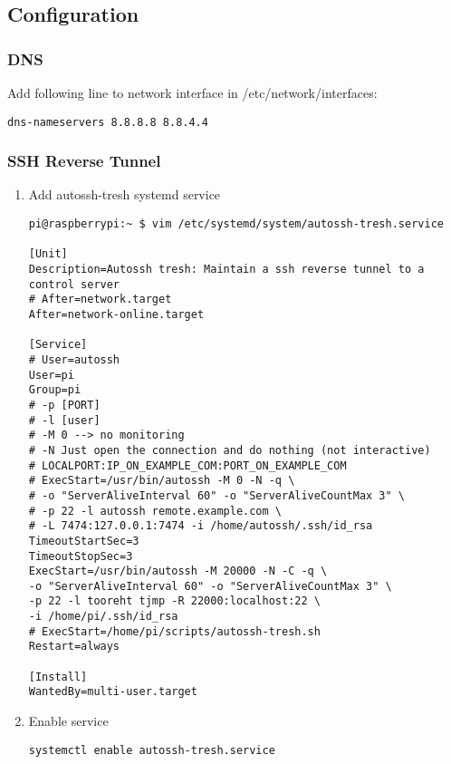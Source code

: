 \subsection*{Configuration}\label{configuration}

\subsubsection*{DNS}\label{dns}

Add following line to network interface in /etc/network/interfaces:

\begin{verbatim}
dns-nameservers 8.8.8.8 8.8.4.4
\end{verbatim}

\subsubsection*{SSH Reverse Tunnel}\label{ssh-reverse-tunnel}

\begin{enumerate}
\def\labelenumi{\arabic{enumi}.}
\item
  Add autossh-tresh systemd service

\begin{verbatim}
pi@raspberrypi:~ $ vim /etc/systemd/system/autossh-tresh.service

[Unit]
Description=Autossh tresh: Maintain a ssh reverse tunnel to a control server
# After=network.target
After=network-online.target

[Service]
# User=autossh
User=pi
Group=pi
# -p [PORT]
# -l [user]
# -M 0 --> no monitoring
# -N Just open the connection and do nothing (not interactive)
# LOCALPORT:IP_ON_EXAMPLE_COM:PORT_ON_EXAMPLE_COM
# ExecStart=/usr/bin/autossh -M 0 -N -q \
# -o "ServerAliveInterval 60" -o "ServerAliveCountMax 3" \
# -p 22 -l autossh remote.example.com \
# -L 7474:127.0.0.1:7474 -i /home/autossh/.ssh/id_rsa
TimeoutStartSec=3
TimeoutStopSec=3
ExecStart=/usr/bin/autossh -M 20000 -N -C -q \
-o "ServerAliveInterval 60" -o "ServerAliveCountMax 3" \
-p 22 -l tooreht tjmp -R 22000:localhost:22 \
-i /home/pi/.ssh/id_rsa
# ExecStart=/home/pi/scripts/autossh-tresh.sh
Restart=always

[Install]
WantedBy=multi-user.target
\end{verbatim}
\item
  Enable service

\begin{verbatim}
systemctl enable autossh-tresh.service
\end{verbatim}
\end{enumerate}

